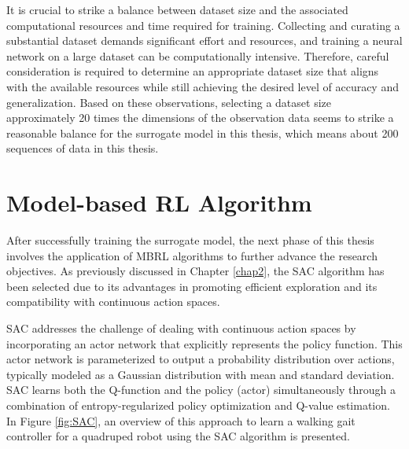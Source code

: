It is crucial to strike a balance between dataset size and the associated computational resources and time required for training. Collecting and curating a substantial dataset demands significant effort and resources, and training a neural network on a large dataset can be computationally intensive. Therefore, careful consideration is required to determine an appropriate dataset size that aligns with the available resources while still achieving the desired level of accuracy and generalization. Based on these observations, selecting a dataset size approximately 20 times the dimensions of the observation data seems to strike a reasonable balance for the surrogate model in this thesis, which means about 200 sequences of data in this thesis.

\section{Model-based RL Algorithm}
After successfully training the surrogate model, the next phase of this thesis involves the application of \ac{MBRL} algorithms to further advance the research objectives. As previously discussed in Chapter \ref{chap2}, the \ac{SAC} algorithm has been selected due to its advantages in promoting efficient exploration and its compatibility with continuous action spaces. 

SAC addresses the challenge of dealing with continuous action spaces by incorporating an actor network that explicitly represents the policy function. This actor network is parameterized to output a probability distribution over actions, typically modeled as a Gaussian distribution with mean and standard deviation. SAC learns both the Q-function and the policy (actor) simultaneously through a combination of entropy-regularized policy optimization and Q-value estimation. In Figure \ref{fig:SAC}, an overview of this approach to learn a walking gait controller for a quadruped robot using the SAC algorithm is presented.
 

